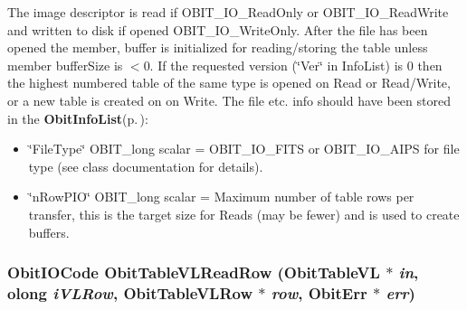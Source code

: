The image descriptor is read if OBIT\_\-IO\_\-Read\-Only or OBIT\_\-IO\_\-Read\-Write and written to disk if opened OBIT\_\-IO\_\-Write\-Only. After the file has been opened the member, buffer is initialized for reading/storing the table unless member buffer\-Size is $<$0. If the requested version (\char`\"{}Ver\char`\"{} in Info\-List) is 0 then the highest numbered table of the same type is opened on Read or Read/Write, or a new table is created on on Write. The file etc. info should have been stored in the {\bf Obit\-Info\-List}{\rm (p.\,\pageref{structObitInfoList})}: \begin{itemize}
\item \char`\"{}File\-Type\char`\"{} OBIT\_\-long scalar = OBIT\_\-IO\_\-FITS or OBIT\_\-IO\_\-AIPS for file type (see class documentation for details). \item \char`\"{}n\-Row\-PIO\char`\"{} OBIT\_\-long scalar = Maximum number of table rows per transfer, this is the target size for Reads (may be fewer) and is used to create buffers. 
\end{itemize}
\subsubsection{\setlength{\rightskip}{0pt plus 5cm}Obit\-IOCode Obit\-Table\-VLRead\-Row ({\bf Obit\-Table\-VL} $\ast$ {\em in}, {\bf olong} {\em i\-VLRow}, {\bf Obit\-Table\-VLRow} $\ast$ {\em row}, {\bf Obit\-Err} $\ast$ {\em err})}\label{ObitTableVL_8c_a22}


